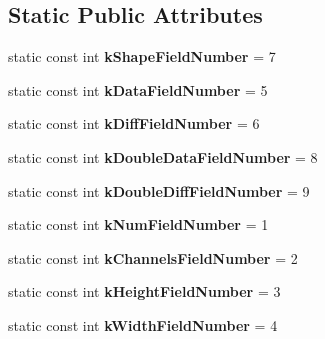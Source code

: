 \subsection*{Static Public Attributes}
\begin{DoxyCompactItemize}
\item 
\mbox{\label{classcaffe_1_1_blob_proto_a760da64683993beca21589c9b293108b}} 
static const int {\bfseries k\+Shape\+Field\+Number} = 7
\item 
\mbox{\label{classcaffe_1_1_blob_proto_a045b0e4ed7cee5fc3681c43a7ec6d16d}} 
static const int {\bfseries k\+Data\+Field\+Number} = 5
\item 
\mbox{\label{classcaffe_1_1_blob_proto_a4d3db5cc2be79a96b0876ec21c2e5620}} 
static const int {\bfseries k\+Diff\+Field\+Number} = 6
\item 
\mbox{\label{classcaffe_1_1_blob_proto_a7b74d2a14d4c05bcc34b616c6d31ef13}} 
static const int {\bfseries k\+Double\+Data\+Field\+Number} = 8
\item 
\mbox{\label{classcaffe_1_1_blob_proto_a808fcb591057071d75e9dbbcde8c7031}} 
static const int {\bfseries k\+Double\+Diff\+Field\+Number} = 9
\item 
\mbox{\label{classcaffe_1_1_blob_proto_a33ae5004a2842ae0ed0554be8036d101}} 
static const int {\bfseries k\+Num\+Field\+Number} = 1
\item 
\mbox{\label{classcaffe_1_1_blob_proto_a598625f1bcd144bc5a2a930a4c72cbd6}} 
static const int {\bfseries k\+Channels\+Field\+Number} = 2
\item 
\mbox{\label{classcaffe_1_1_blob_proto_a0f8e3621ba30d0b73fdbe3fdfb8fb34c}} 
static const int {\bfseries k\+Height\+Field\+Number} = 3
\item 
\mbox{\label{classcaffe_1_1_blob_proto_a90a1aea27c7b3a8be92f615eb5023ffe}} 
static const int {\bfseries k\+Width\+Field\+Number} = 4
\end{DoxyCompactItemize}
